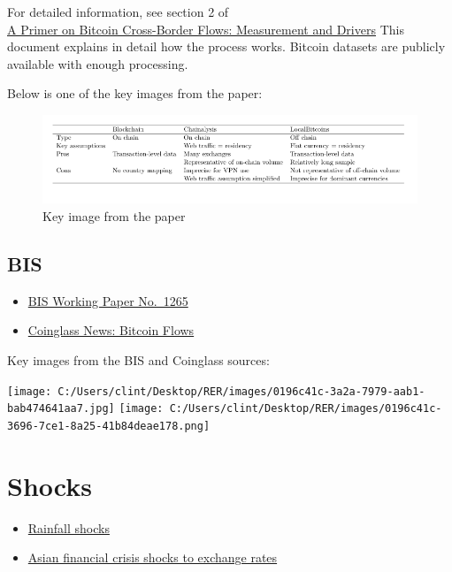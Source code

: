 \documentclass[
  11pt,
]{article}
\providecommand{\tightlist}{%
  \setlength{\itemsep}{0pt}\setlength{\parskip}{0pt}}\usepackage{longtable,booktabs,array}
\begin{document}
For detailed information, see section 2 of\\
\href{https://drive.google.com/file/d/1JlapQvyER-SgX0z91l8NzTDcXR9Z5Oo5/view?usp=sharing}{A
Primer on Bitcoin Cross-Border Flows: Measurement and Drivers} This
document explains in detail how the process works. Bitcoin datasets are
publicly available with enough processing.

Below is one of the key images from the paper:

\begin{figure}[H]

{\centering \includegraphics{images/Screenshot 2025-08-28 053010.png}

}

\caption{Key image from the paper}

\end{figure}%

\subsection{BIS}\label{bis}

\begin{itemize}
\tightlist
\item
  \href{https://www.bis.org/publ/work1265.pdf}{BIS Working Paper
  No.~1265}\\
\item
  \href{https://www.coinglass.com/news/471951?utm_source=chatgpt.com}{Coinglass
  News: Bitcoin Flows}
\end{itemize}

Key images from the BIS and Coinglass sources:

\texttt{[image: C:/Users/clint/Desktop/RER/images/0196c41c-3a2a-7979-aab1-bab474641aa7.jpg]}
\texttt{[image: C:/Users/clint/Desktop/RER/images/0196c41c-3696-7ce1-8a25-41b84deae178.png]}

\section{Shocks}\label{shocks}

\begin{itemize}
\tightlist
\item
  \href{https://academic.oup.com/wber/article/21/2/219/1916657?login=true\#111402059}{Rainfall
  shocks}
\item
  \href{https://www.nber.org/system/files/working_papers/w12325/w12325.pdf}{Asian
  financial crisis shocks to exchange rates}
\end{itemize}
\end{document}
